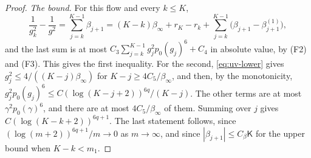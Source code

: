 \begin{proof}
\emph{The bound.} For this flow and every $k\le K$,
\[
\frac1{g_k^2}-\frac1{g^2}=\sum_{j=k}^{K-1}\beta_{j+1}=(K-k)\beta_\infty+r_K-r_k+\sum_{j=k}^{K-1}\big(\beta_{j+1}-\beta^{(1)}_{j+1}\big),
\]
and the last sum is at most $C_3\sum_{j=k}^{K-1}g_j^2p_0(g_j)^6+C_4$ in absolute value, by (F2) and (F3). This gives the first inequality. For the second, \eqref{eq:uv-lower} gives $g_j^2\le4/((K-j)\beta_\infty)$ for $K-j\ge4C_5/\beta_\infty$, and then, by the monotonicity, $g_j^2p_0(g_j)^6\le C(\log(K-j+2))^{6q}/(K-j)$. The other terms are at most $\gamma^2p_0(\gamma)^6$, and there are at most $4C_5/\beta_\infty$ of them. Summing over $j$ gives $C(\log(K-k+2))^{6q+1}$. The last statement follows, since $(\log(m+2))^{6q+1}/m\to0$ as $m\to\infty$, and since $|\beta_{j+1}|\le C_\beta\mathsf K$ for the upper bound when $K-k<m_1$.
\end{proof}

